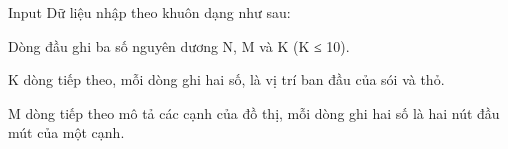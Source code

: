 Input
Dữ liệu nhập theo khuôn dạng như sau:

Dòng đầu ghi ba số nguyên dương N, M và K (K ≤ 10).

K dòng tiếp theo, mỗi dòng ghi hai số, là vị trí ban đầu của sói và thỏ.

M dòng tiếp theo mô tả các cạnh của đồ thị, mỗi dòng ghi hai số là hai nút đầu mút của một cạnh.